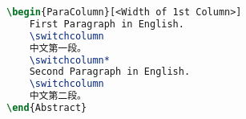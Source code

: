 \begin{lstlisting}[language=LaTeX, caption=ParaColumn Environment, label=listing:paracolumn]
\begin{ParaColumn}[<Width of 1st Column>]
    First Paragraph in English.
    \switchcolumn
    中文第一段。
    \switchcolumn*
    Second Paragraph in English.
    \switchcolumn
    中文第二段。
\end{Abstract}
\end{lstlisting}